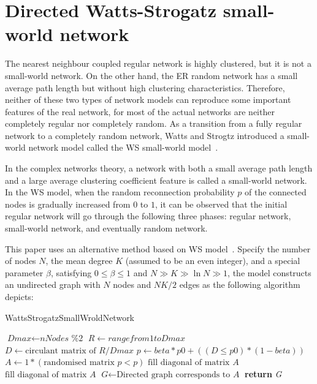 \section{Directed Watts-Strogatz small-world network}
The nearest neighbour coupled regular network is highly clustered, but it is not a small-world network. On the other hand, the ER random network has a small average path length but without high clustering characteristics. Therefore, neither of these two types of network models can reproduce some important features of the real network, for most of the actual networks are neither completely regular nor completely random. As a transition from a fully regular network to a completely random network, Watts and Strogtz introduced a small-world network model called the WS small-world model~\cite{watts1998collective}.


In the complex networks theory, a network with both a small average path length and a large average clustering coefficient feature is called a small-world network. In the WS model, when the random reconnection probability $p$ of the connected nodes is gradually increased from $0$ to $1$, it can be observed that the initial regular network will go through the following three phases: regular network, small-world network, and eventually random network.

This paper uses an alternative method based on WS model~\cite{song2014simple}. Specify the number of nodes $N$, the mean degree $K$ (assumed to be an even integer), and a special parameter $\beta$, satisfying $0\leq \beta \leq 1$ and $N\gg K\gg \ln N\gg 1$, the model constructs an undirected graph with $N$ nodes and ${NK}/{2}$ edges as the following algorithm depicts:

\begin{algorithm}[H]
	\caption{WattsStrogatzSmallWroldNetwork}\label{alg:smallworld}
	\begin{algorithmic}[1]
		\State $\textit{Dmax} \gets \textit{nNodes \% 2}$
		\State $\textit{R} \gets range from 1 to \textit{Dmax}$
		\State $\textit{D} \gets \text{circulant matrix of } \textit{R}/\textit{Dmax}$
		\State $\textit{p} \gets \textit{beta}*\textit{p0}+((\textit{D} \leq \textit{p0})*(1-\textit{beta}))$
		\State $\textit{A} \gets 1*(\text{randomised matrix }\textit{p} < p)$
		\State $\text{fill diagonal of matrix }\textit{A}$
		\State $\text{fill diagonal of matrix }\textit{A}$
		\State $\textit{G} \gets \text{Directed graph corresponds to }\textit{A}$
		\State \textbf{return} {\textit{G}}
		\EndProcedure
	\end{algorithmic}
\end{algorithm}

